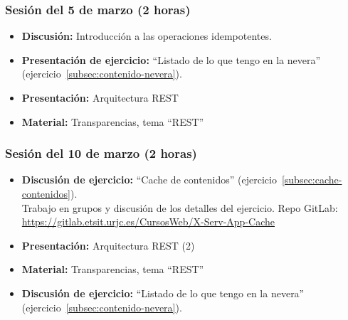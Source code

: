 \documentclass[a4paper,12pt]{article}
\begin{document}
\subsubsection{Sesión del 5 de marzo (2 horas)}

\begin{itemize}
\item \textbf{Discusión:} Introducción a las operaciones idempotentes.
\item \textbf{Presentación de ejercicio:} ``Listado de lo que tengo en la nevera'' (ejercicio~\ref{subsec:contenido-nevera}).
\item \textbf{Presentación:} Arquitectura REST
\item \textbf{Material:} Transparencias, tema ``REST''
\end{itemize}

\subsubsection{Sesión del 10 de marzo (2 horas)}

\begin{itemize}
\item \textbf{Discusión de ejercicio:} ``Cache de contenidos'' (ejercicio~\ref{subsec:cache-contenidos}). \\
  Trabajo en grupos y discusión de los detalles del ejercicio.
  Repo GitLab: \url{https://gitlab.etsit.urjc.es/CursosWeb/X-Serv-App-Cache}
\item \textbf{Presentación:} Arquitectura REST (2)
\item \textbf{Material:} Transparencias, tema ``REST''
\item \textbf{Discusión de ejercicio:} ``Listado de lo que tengo en la nevera'' (ejercicio~\ref{subsec:contenido-nevera}).
\end{itemize}



\end{document}
